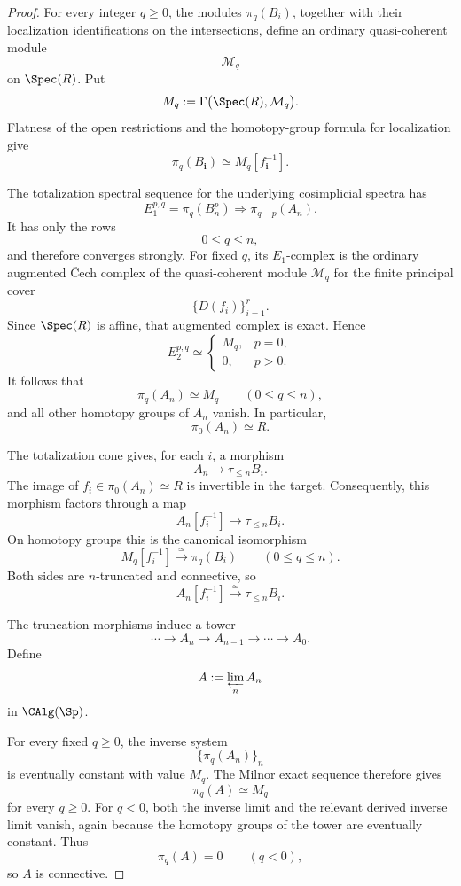 \begin{proof}
For every integer \(q\geq0\), the modules \(\pi_q(B_i)\), together with
their localization identifications on the intersections, define an
ordinary quasi-coherent module
\[
    \mathcal M_q
\]
on \(\Spec(R)\). Put
\[
    M_q
    :=
    \Gamma
    \bigl(
        \Spec(R),
        \mathcal M_q
    \bigr).
\]
Flatness of the open restrictions and the homotopy-group formula for
localization give
\[
    \pi_q(B_{\mathbf i})
    \simeq
    M_q[f_{\mathbf i}^{-1}].
\]

The totalization spectral sequence for the underlying cosimplicial
spectra has
\[
    E_1^{p,q}
    =
    \pi_q(B_n^p)
    \Longrightarrow
    \pi_{q-p}(A_n).
\]
It has only the rows
\[
    0\leq q\leq n,
\]
and therefore converges strongly. For fixed \(q\), its \(E_1\)-complex
is the ordinary augmented \v{C}ech complex of the quasi-coherent module
\(\mathcal M_q\) for the finite principal cover
\[
    \{D(f_i)\}_{i=1}^r.
\]
Since \(\Spec(R)\) is affine, that augmented complex is exact. Hence
\[
    E_2^{p,q}
    \simeq
    \begin{cases}
        M_q,&p=0,\\
        0,&p>0.
    \end{cases}
\]
It follows that
\[
    \pi_q(A_n)
    \simeq
    M_q
    \qquad
    (0\leq q\leq n),
\]
and all other homotopy groups of \(A_n\) vanish. In particular,
\[
    \pi_0(A_n)
    \simeq
    R.
\]

The totalization cone gives, for each \(i\), a morphism
\[
    A_n
    \longrightarrow
    \tau_{\leq n}B_i.
\]
The image of \(f_i\in\pi_0(A_n)\simeq R\) is invertible in the target.
Consequently, this morphism factors through a map
\[
    A_n[f_i^{-1}]
    \longrightarrow
    \tau_{\leq n}B_i.
\]
On homotopy groups this is the canonical isomorphism
\[
    M_q[f_i^{-1}]
    \xrightarrow{\simeq}
    \pi_q(B_i)
    \qquad
    (0\leq q\leq n).
\]
Both sides are \(n\)-truncated and connective, so
\[
    A_n[f_i^{-1}]
    \xrightarrow{\simeq}
    \tau_{\leq n}B_i.
\]

The truncation morphisms induce a tower
\[
    \cdots
    \longrightarrow
    A_n
    \longrightarrow
    A_{n-1}
    \longrightarrow
    \cdots
    \longrightarrow
    A_0.
\]
Define
\[
    A
    :=
    \varprojlim_nA_n
\]
in \(\CAlg(\Sp)\).

For every fixed \(q\geq0\), the inverse system
\[
    \{\pi_q(A_n)\}_n
\]
is eventually constant with value \(M_q\). The Milnor exact sequence
therefore gives
\[
    \pi_q(A)
    \simeq
    M_q
\]
for every \(q\geq0\). For \(q<0\), both the inverse limit and the relevant
derived inverse limit vanish, again because the homotopy groups of the
tower are eventually constant. Thus
\[
    \pi_q(A)=0
    \qquad
    (q<0),
\]
so \(A\) is connective.


\end{proof}
